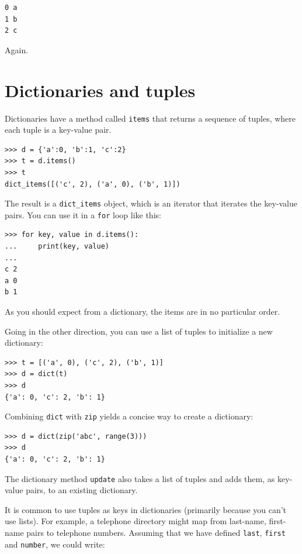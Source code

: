 \documentclass[10pt]{book}
\begin{document}
\begin{verbatim}
0 a
1 b
2 c
\end{verbatim}
%
Again.


\section{Dictionaries and tuples}
\label{dictuple}

Dictionaries have a method called {\tt items} that returns a sequence of
tuples, where each tuple is a key-value pair.

\begin{verbatim}
>>> d = {'a':0, 'b':1, 'c':2}
>>> t = d.items()
>>> t
dict_items([('c', 2), ('a', 0), ('b', 1)])
\end{verbatim}
%
The result is a \verb"dict_items" object, which is an iterator that
iterates the key-value pairs.  You can use it in a {\tt for} loop
like this:

\begin{verbatim}
>>> for key, value in d.items():
...     print(key, value)
...
c 2
a 0
b 1
\end{verbatim}
%
As you should expect from a dictionary, the items are in no
particular order.

Going in the other direction, you can use a list of tuples to
initialize a new dictionary: 

\begin{verbatim}
>>> t = [('a', 0), ('c', 2), ('b', 1)]
>>> d = dict(t)
>>> d
{'a': 0, 'c': 2, 'b': 1}
\end{verbatim}

Combining {\tt dict} with {\tt zip} yields a concise way
to create a dictionary:

\begin{verbatim}
>>> d = dict(zip('abc', range(3)))
>>> d
{'a': 0, 'c': 2, 'b': 1}
\end{verbatim}
%
The dictionary method {\tt update} also takes a list of tuples
and adds them, as key-value pairs, to an existing dictionary.

It is common to use tuples as keys in dictionaries (primarily because
you can't use lists).  For example, a telephone directory might map
from last-name, first-name pairs to telephone numbers.  Assuming
that we have defined {\tt last}, {\tt first} and {\tt number}, we
could write:
\end{document}

